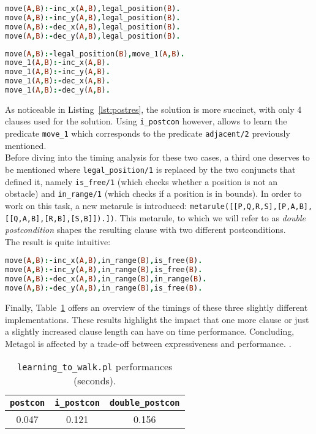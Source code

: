 \begin{lstlisting}[label={lst:postres},language=Prolog, caption=\texttt{postcon} result, belowcaptionskip=1cm]
move(A,B):-inc_x(A,B),legal_position(B).
move(A,B):-inc_y(A,B),legal_position(B).
move(A,B):-dec_x(A,B),legal_position(B).
move(A,B):-dec_y(A,B),legal_position(B).
\end{lstlisting}

\begin{lstlisting}[language=Prolog, caption=\texttt{i\_postcon} result, belowcaptionskip=1cm]
move(A,B):-legal_position(B),move_1(A,B).
move_1(A,B):-inc_x(A,B).
move_1(A,B):-inc_y(A,B).
move_1(A,B):-dec_x(A,B).
move_1(A,B):-dec_y(A,B).
\end{lstlisting}
As noticeable in Listing~\ref{lst:postres}, the solution is more succinct, with only 4 clauses
used for the solution. Using \texttt{i\_postcon} however, allows to learn the predicate \texttt{move\_1}
which corresponds to the predicate \texttt{adjacent/2} previously mentioned.\\

Before diving into the timing analysis for these two cases, a third one deserves to be mentioned where \texttt{legal\_position/1}
is replaced by the two conjuncts that defined it, namely \texttt{is\_free/1} (which checks whether a position is not an obstacle) and
\texttt{in\_range/1} (which checks if a position is in bounds).
In order to work on this task, a new metarule is introduced: \texttt{metarule([[P,Q,R,S],[P,A,B],[[Q,A,B],[R,B],[S,B]]).])}. This metarule,
to which we will refer to as \emph{double postcondition} shapes the resulting clause with two different postconditions.\\
The result is quite intuitive:
\begin{lstlisting}[language=Prolog, caption=\emph{Double postcondition} result, belowcaptionskip=1cm]
move(A,B):-inc_x(A,B),in_range(B),is_free(B).
move(A,B):-inc_y(A,B),in_range(B),is_free(B).
move(A,B):-dec_x(A,B),in_range(B),in_range(B).
move(A,B):-dec_y(A,B),in_range(B),is_free(B).
\end{lstlisting}

Finally, Table~\ref{tab:walk_res} offers an overview of the timings of these three slightly different implementations. These results highlight the impact that
one more clause or just a slightly increased clause length can have on time performance. Concluding, Metagol is affected by a trade-off between expressiveness and performance.
.
{
\begin{center}
    \begin{table}[h]
    \centering
    \begin{tabular}{ |c|c|c| } 
        \hline
        \texttt{postcon} & \texttt{i\_postcon} & \texttt{double\_postcon} \\ \hline
        0.047 & 0.121 & 0.156 \\ 
        \hline
    \end{tabular}
    \caption{\label{tab:walk_res}\texttt{learning\_to\_walk.pl} performances (seconds).}
    \end{table}
\end{center}
}

